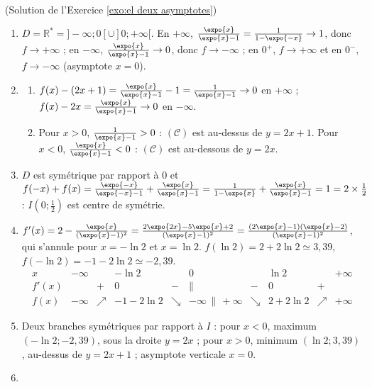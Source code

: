 \begin{corrige}
\begin{sol} ~ \\
(Solution de l'Exercice \ref{exo:el deux asymptotes})
\begin{enumerate}
\item $D = \mathbb{R}^* = ]-\infty;0[ \cup ]0;+\infty[$. En $+\infty$, $\frac{\expo{x}}{\expo{x}-1} = \frac{1}{1 - \expo{-x}} \to 1$, donc $f \to +\infty$ ;
      en $-\infty$, $\frac{\expo{x}}{\expo{x}-1} \to 0$, donc $f \to -\infty$ ; en $0^+$, $f \to +\infty$ et en $0^-$, $f \to -\infty$ (asymptote $x = 0$).
\item \begin{enumerate}
      \item $f(x) - (2x+1) = \frac{\expo{x}}{\expo{x}-1} - 1 = \frac{1}{\expo{x}-1} \to 0$ en $+\infty$ ;
            $f(x) - 2x = \frac{\expo{x}}{\expo{x}-1} \to 0$ en $-\infty$.
      \item Pour $x > 0$, $\frac{1}{\expo{x}-1} > 0$ : $(\mathcal{C})$ est au-dessus de $y = 2x + 1$.
            Pour $x < 0$, $\frac{\expo{x}}{\expo{x}-1} < 0$ : $(\mathcal{C})$ est au-dessous de $y = 2x$.
      \end{enumerate}
\item $D$ est sym\'etrique par rapport \`a $0$ et $f(-x) + f(x) = \frac{\expo{-x}}{\expo{-x}-1} + \frac{\expo{x}}{\expo{x}-1} = \frac{1}{1 - \expo{x}} + \frac{\expo{x}}{\expo{x}-1} = 1 = 2 \times \frac{1}{2}$ :
      $I\left(0;\frac{1}{2}\right)$ est centre de sym\'etrie.
\item $f'(x) = 2 - \frac{\expo{x}}{(\expo{x}-1)^2} = \frac{2\expo{2x} - 5\expo{x} + 2}{(\expo{x}-1)^2} = \frac{(2\expo{x} - 1)(\expo{x} - 2)}{(\expo{x}-1)^2}$,
      qui s'annule pour $x = -\ln 2$ et $x = \ln 2$. $f(\ln 2) = 2 + 2\ln 2 \simeq 3{,}39$, $f(-\ln 2) = -1 - 2\ln 2 \simeq -2{,}39$.
      \[
      \begin{array}{c|ccccccccc}
      x & -\infty & & -\ln 2 & & 0 & & \ln 2 & & +\infty \\ \hline
      f'(x) & & + & 0 & - & \| & - & 0 & + & \\ \hline
      f(x) & -\infty & \nearrow & -1 - 2\ln 2 & \searrow & -\infty \, \| \, +\infty & \searrow & 2 + 2\ln 2 & \nearrow & +\infty
      \end{array}
      \]
\item Deux branches sym\'etriques par rapport \`a $I$ : pour $x < 0$, maximum $(-\ln 2 ; -2{,}39)$, sous la droite $y = 2x$ ;
      pour $x > 0$, minimum $(\ln 2 ; 3{,}39)$, au-dessus de $y = 2x + 1$ ; asymptote verticale $x = 0$.
\item \begin{enumerate}

\end{enumerate}
\end{enumerate}
\end{sol}
\end{corrige}
